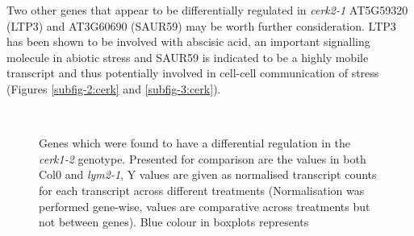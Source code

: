 \documentclass[../main.tex]{subfiles}
\begin{document}
Two other genes that appear to be differentially regulated in \textit{cerk2-1}
AT5G59320 (LTP3) and AT3G60690 (SAUR59) may be worth further consideration. LTP3
has been shown to be involved with abscisic acid, an important signalling
molecule in abiotic stress \cite{vishwakarmaAbscisicAcidSignaling2017} and
SAUR59 is indicated to be a highly mobile transcript
\cite{thiemeEndogenousArabidopsisMessenger2015} and thus potentially involved in
cell-cell communication of stress (Figures \ref{subfig-2:cerk} and
\ref{subfig-3:cerk}).



\begin{figure}[!ht]
  \\
  
  \caption{Genes which were found to have a differential regulation in the
    \textit{cerk1-2} genotype. Presented for comparison are the values in both
    Col0 and \textit{lym2-1}, Y values are given as normalised transcript counts
    for each transcript across different treatments (Normalisation was performed
    gene-wise, values are comparative across treatments but not between genes).
    Blue colour in boxplots represents }
  \label{fig:cerk}
\end{figure}
\end{document}
